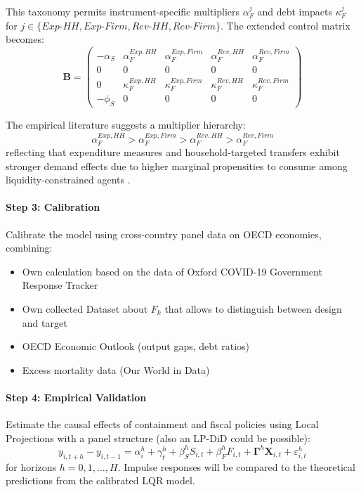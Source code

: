 \documentclass[12pt, a4paper]{article}
\begin{document}
\noindent This taxonomy permits instrument-specific multipliers 
$\alpha_F^{j}$ and debt impacts $\kappa_F^{j}$ for 
$j \in \{Exp\text{-}HH, Exp\text{-}Firm, Rev\text{-}HH, Rev\text{-}Firm\}$. 
The extended control matrix becomes:
\begin{equation}
    \bm{B} = 
    \begin{pmatrix}
        -\alpha_S & \alpha_F^{Exp,HH} & \alpha_F^{Exp,Firm} & 
        \alpha_F^{Rev,HH} & \alpha_F^{Rev,Firm} \\
        0 & 0 & 0 & 0 & 0 \\
        0 & \kappa_F^{Exp,HH} & \kappa_F^{Exp,Firm} & 
        \kappa_F^{Rev,HH} & \kappa_F^{Rev,Firm} \\
        -\phi_S & 0 & 0 & 0 & 0
    \end{pmatrix}
\end{equation}

\noindent The empirical literature suggests a multiplier hierarchy:
\begin{equation}
    \alpha_F^{Exp,HH} > \alpha_F^{Exp,Firm} > 
    \alpha_F^{Rev,HH} > \alpha_F^{Rev,Firm}
\end{equation}
reflecting that expenditure measures and household-targeted 
transfers exhibit stronger demand effects due to higher marginal 
propensities to consume among liquidity-constrained agents 
\citep{coibion2020stimulus, chetty2020e}.



\paragraph{Step 3: Calibration}
Calibrate the model using cross-country panel data on OECD 
economies, combining:
\begin{itemize}
    \item Own calculation based on the data of Oxford COVID-19 Government Response Tracker
    \item Own collected Dataset about $F_k$ that allows to distinguish between design and target
    \item OECD Economic Outlook (output gaps, debt ratios)
    \item Excess mortality data (Our World in Data)
\end{itemize}


\paragraph{Step 4: Empirical Validation}
Estimate the causal effects of containment and fiscal policies 
using Local Projections \citep{Jorda2025} with a panel structure (also an LP-DiD could be possible):
\begin{equation}
    y_{i,t+h} - y_{i,t-1} = \alpha_i^h + \gamma_t^h + 
    \beta_S^h S_{i,t} + \beta_F^h F_{i,t} + \bm{\Gamma}^h \bm{X}_{i,t} + 
    \varepsilon_{i,t}^h
\end{equation}
for horizons $h = 0, 1, \ldots, H$. Impulse responses will be 
compared to the theoretical predictions from the calibrated LQR 
model.
\end{document}
